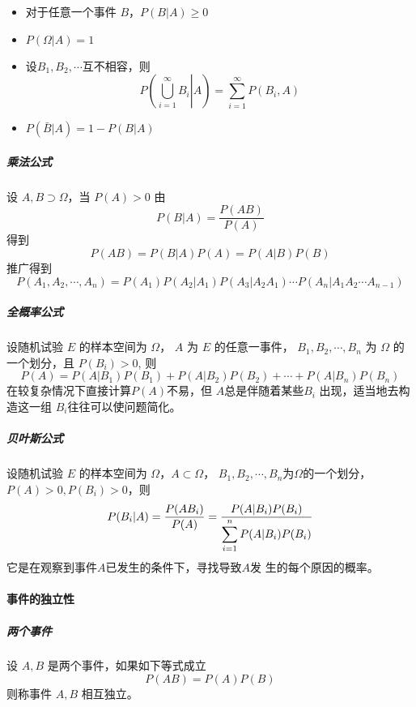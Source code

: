 \begin{itemize}[leftmargin=\paritemindent]
    \item 对于任意一个事件 $B$，$P(B|A) \geqslant 0$
    \item $P(\Omega | A)=1$
    \item 设$B_1,B_2,\cdots$互不相容，则 \begin{equation}
        P\left(\left. \bigcup_{i=1}^\infty B_i \right| A \right) = \sum_{i=1}^\infty P(B_i,A)
    \end{equation}
    \item $P(\bar{B} |A) = 1 - P(B|A)$
\end{itemize}

\subparagraph{乘法公式} 设 $A,B \supset \Omega$，当 $P(A) > 0$ 由
\begin{equation*}
    P(B|A) = \frac{P(AB)}{P(A)}
\end{equation*} 得到 \begin{equation}
    P(AB) = P(B|A)P(A) = P(A|B)P(B)
\end{equation} 推广得到
\begin{equation}
    P(A_1,A_2, \cdots ,A_n) = P(A_1)P(A_2|A_1)P(A_3|A_2A_1) \cdots
    P(A_{n}|A_1A_2\cdots A_{n-1})
\end{equation}

\subparagraph{全概率公式} 设随机试验 $E$ 的样本空间为 $\Omega$， $A$ 为 $E$ 的任意一事件，
$B_1,B_2,\cdots,B_n$ 为 $\Omega$ 的一个划分，且 $P(B_i) > 0$, 则
\begin{equation}
    P(A) = P(A|B_1)P(B_1) + P(A|B_2)P(B_2) + \cdots + P(A|B_n)P(B_n)
\end{equation}
在较复杂情况下直接计算$P(A)$不易，但 $A$总是伴随着某些$B_i$ 出现，适当地去构造这一组 $B_i$往往可以使问题简化。

\subparagraph{贝叶斯公式} 设随机试验 $E$ 的样本空间为 $\Omega$，$A \subset \Omega$，
$B_1,B_2,\cdots,B_n$为$\Omega$的一个划分，$P(A) > 0,P(B_i)>0$，则
\begin{equation}
    P(B_i|A) = \frac{P(AB_i)}{P(A)} = \displaystyle{\frac{\displaystyle{
        P(A|B_i)P(B_i)
    }}{\displaystyle{
        \sum_{i=1}^n P(A|B_i)P(B_i)
    }}}
\end{equation}
它是在观察到事件$A$已发生的条件下，寻找导致$A$发 生的每个原因的概率。

\paragraph{事件的独立性}
\subparagraph{两个事件}设 $A,B$ 是两个事件，如果如下等式成立 
\begin{equation}
    P(AB) = P(A)P(B)
\end{equation}
则称事件 $A,B$ 相互独立。

